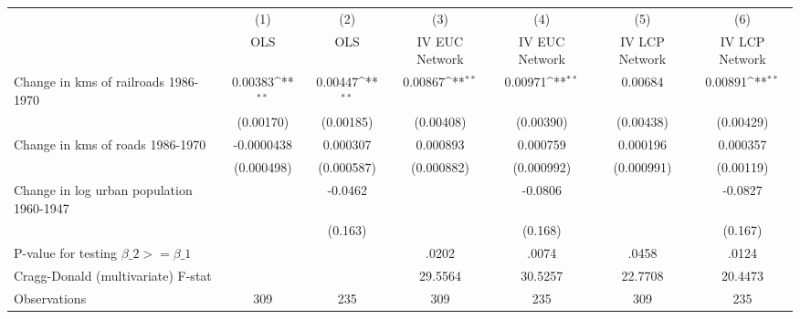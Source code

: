 {
\def\sym#1{\ifmmode^{#1}\else\(^{#1}\)\fi}
\begin{tabular}{l*{6}{c}}
\hline\hline
                &\multicolumn{1}{c}{(1)}&\multicolumn{1}{c}{(2)}&\multicolumn{1}{c}{(3)}&\multicolumn{1}{c}{(4)}&\multicolumn{1}{c}{(5)}&\multicolumn{1}{c}{(6)}\\
                &\multicolumn{1}{c}{OLS}&\multicolumn{1}{c}{OLS}&\multicolumn{1}{c}{IV EUC Network}&\multicolumn{1}{c}{IV EUC Network}&\multicolumn{1}{c}{IV LCP Network}&\multicolumn{1}{c}{IV LCP Network}\\
\hline
Change in kms of railroads 1986-1970&  0.00383\sym{**} &  0.00447\sym{**} &  0.00867\sym{**} &  0.00971\sym{**} &  0.00684         &  0.00891\sym{**} \\
                &(0.00170)         &(0.00185)         &(0.00408)         &(0.00390)         &(0.00438)         &(0.00429)         \\
[1em]
Change in kms of roads 1986-1970&-0.0000438         & 0.000307         & 0.000893         & 0.000759         & 0.000196         & 0.000357         \\
                &(0.000498)         &(0.000587)         &(0.000882)         &(0.000992)         &(0.000991)         &(0.00119)         \\
[1em]
Change in log urban population 1960-1947&                  &  -0.0462         &                  &  -0.0806         &                  &  -0.0827         \\
                &                  &  (0.163)         &                  &  (0.168)         &                  &  (0.167)         \\
\hline
P-value for testing $\beta\_{2} >= \beta\_{1}$&                  &                  &    .0202         &    .0074         &    .0458         &    .0124         \\
Cragg-Donald (multivariate) F-stat&                  &                  &  29.5564         &  30.5257         &  22.7708         &  20.4473         \\
Observations    &      309         &      235         &      309         &      235         &      309         &      235         \\
\hline\hline
\end{tabular}
}
